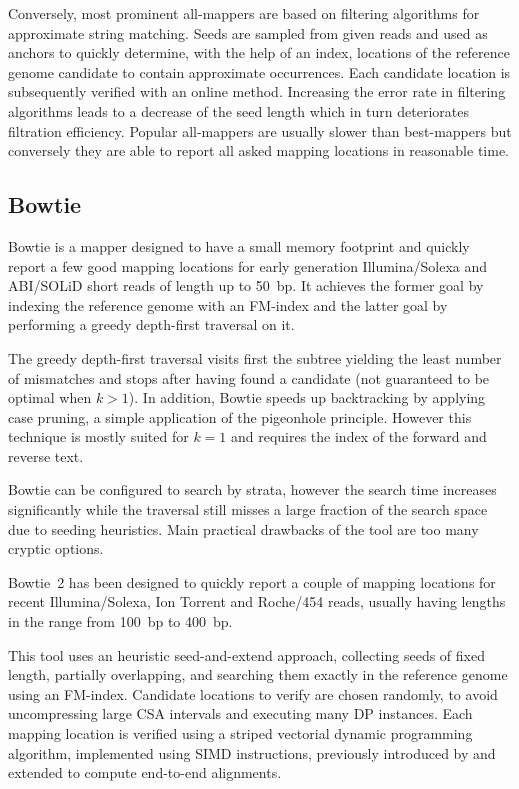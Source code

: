Conversely, most prominent all-mappers are based on filtering algorithms for approximate string matching.
Seeds are sampled from given reads and used as anchors to quickly determine, with the help of an index, locations of the reference genome candidate to contain approximate occurrences. Each candidate location is subsequently verified with an online method.
Increasing the error rate in filtering algorithms leads to a decrease of the seed length which in turn deteriorates filtration efficiency.
Popular all-mappers are usually slower than best-mappers but conversely they are able to report all asked mapping locations in reasonable time.


\subsection{Bowtie}

Bowtie \citep{Bowtie} is a mapper designed to have a small memory footprint and quickly report a few good mapping locations for early generation Illumina/Solexa and ABI/SOLiD short reads of length up to 50~bp.
It achieves the former goal by indexing the reference genome with an FM-index and the latter goal by performing a greedy depth-first traversal on it.

The greedy depth-first traversal visits first the subtree yielding the least number of mismatches and stops after having found a candidate (not guaranteed to be optimal when $k>1$).
In addition, Bowtie speeds up backtracking by applying case pruning, a simple application of the pigeonhole principle.
However this technique is mostly suited for $k=1$ and requires the index of the forward and reverse text.

Bowtie can be configured to search by strata, however the search time increases significantly while the traversal still misses a large fraction of the search space due to seeding heuristics.
Main practical drawbacks of the tool are too many cryptic options.

Bowtie~2 \citep{Bowtie2} has been designed to quickly report a couple of mapping locations for recent Illumina/Solexa, Ion Torrent and Roche/454 reads, usually having lengths in the range from 100~bp to 400~bp.

This tool uses an heuristic seed-and-extend approach, collecting seeds of fixed length, partially overlapping, and searching them exactly in the reference genome using an FM-index.
Candidate locations to verify are chosen randomly, to avoid uncompressing large CSA intervals and executing many DP instances.
Each mapping location is verified using a striped vectorial dynamic programming algorithm, implemented using SIMD instructions, previously introduced by \citep{Farrar2007} and extended to compute end-to-end alignments.

